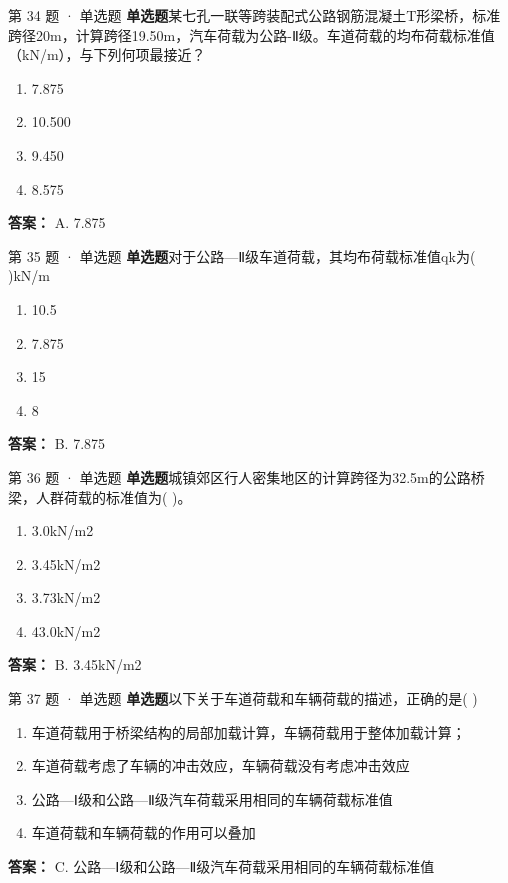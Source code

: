 \documentclass[UTF8,zihao=-4,openany]{ctexbook}
\newenvironment{choices}{\begin{enumerate}[label=\Alph*.,leftmargin=9mm,labelsep=3mm,itemsep=2pt,topsep=4pt]}{\end{enumerate}}
\newcommand{\qtype}[1]{\textcolor{brand}{\sffamily\bfseries #1}}
\begin{document}
\begin{questionbox}{第 34 题 · 单选题}
\qtype{单选题}\quad 某七孔一联等跨装配式公路钢筋混凝土T形梁桥，标准跨径20m，计算跨径19.50m，汽车荷载为公路-Ⅱ级。车道荷载的均布荷载标准值（kN/m），与下列何项最接近？
\begin{choices}
\item 7.875
\item 10.500
\item 9.450
\item 8.575
\end{choices}
\begin{answerbox}
\textbf{答案：} A. 7.875
\end{answerbox}
\end{questionbox}

\begin{questionbox}{第 35 题 · 单选题}
\qtype{单选题}\quad 对于公路—Ⅱ级车道荷载，其均布荷载标准值qk为( )kN/m
\begin{choices}
\item 10.5
\item 7.875
\item 15
\item 8
\end{choices}
\begin{answerbox}
\textbf{答案：} B. 7.875
\end{answerbox}
\end{questionbox}

\begin{questionbox}{第 36 题 · 单选题}
\qtype{单选题}\quad 城镇郊区行人密集地区的计算跨径为32.5m的公路桥梁，人群荷载的标准值为( )。
\begin{choices}
\item 3.0kN/m2
\item 3.45kN/m2
\item 3.73kN/m2
\item 43.0kN/m2
\end{choices}
\begin{answerbox}
\textbf{答案：} B. 3.45kN/m2
\end{answerbox}
\end{questionbox}

\begin{questionbox}{第 37 题 · 单选题}
\qtype{单选题}\quad 以下关于车道荷载和车辆荷载的描述，正确的是( )
\begin{choices}
\item 车道荷载用于桥梁结构的局部加载计算，车辆荷载用于整体加载计算；
\item 车道荷载考虑了车辆的冲击效应，车辆荷载没有考虑冲击效应
\item 公路—Ⅰ级和公路—Ⅱ级汽车荷载采用相同的车辆荷载标准值
\item 车道荷载和车辆荷载的作用可以叠加
\end{choices}
\begin{answerbox}
\textbf{答案：} C. 公路—Ⅰ级和公路—Ⅱ级汽车荷载采用相同的车辆荷载标准值
\end{answerbox}
\end{questionbox}
\end{document}
